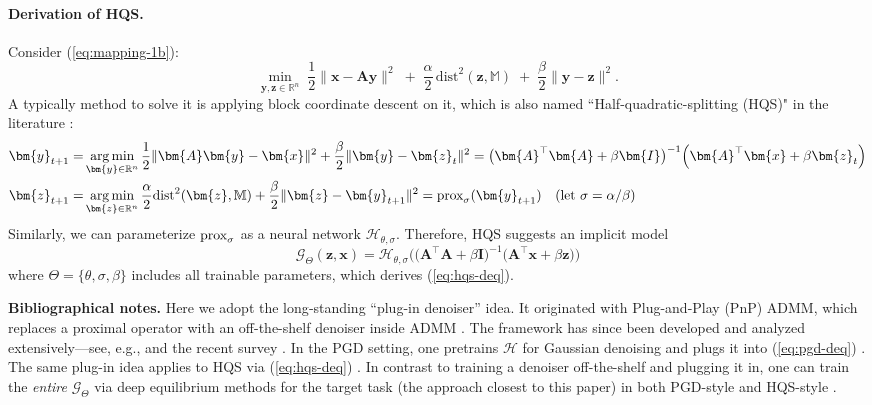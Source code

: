 \documentclass{amsart} %
\def\eqref#1{equation~\ref{#1}}
\def\vx{{\bm{x}}}
\def\vy{{\bm{y}}}
\def\vz{{\bm{z}}}
\def\mA{{\bm{A}}}
\def\mI{{\bm{I}}}
\def\sM{{\mathbb{M}}}
\def\sR{{\mathbb{R}}}
\DeclareMathOperator*{\argmin}{arg\,min}
\def\cG{{\mathcal{G}}}
\def\cH{{\mathcal{H}}}
\theoremstyle{definition}
\theoremstyle{remark}
\renewcommand{\eqref}[1]{\textup{(\ref{#1})}}
\begin{document}
\paragraph{Derivation of HQS.}
Consider \eqref{eq:mapping-1b}:
\[
\min_{\vy,\vz\in\sR^n}\;\frac{1}{2}\|\vx-\mA\vy\|^2 \;+\; \frac{\alpha}{2}\,\mathrm{dist}^2(\vz,\sM) \;+\; \frac{\beta}{2}\|\vy-\vz\|^2.
\]
A typically method to solve it is applying block coordinate descent on it, which is also named ``Half-quadratic-splitting (HQS)" in the literature \cite{geman1995nonlinear}:
\[ 
\begin{aligned}
\vy_{t+1} = & \argmin_{\vy\in\sR^n} \frac{1}{2} \|\mA \vy - \vx\|^2 + \frac{\beta}{2} \|\vy - \vz_t\|^2 = \big(\mA^\top\mA + \beta \mI \big)^{-1} \Big( \mA^\top \vx + \beta \vz_t \Big)\\
\vz_{t+1} = & \argmin_{\vz\in\sR^n} \frac{\alpha}{2} \textup{dist}^2(\vz,\sM) + \frac{\beta}{2} \|\vz - \vy_{t+1}\|^2 = \textup{prox}_{\sigma} (\vy_{t+1}) \quad (\textup{let } \sigma=\alpha/\beta)
\end{aligned}
\]
Similarly, we can parameterize $\textup{prox}_{\sigma}$ as a neural network $\cH_{\theta,\sigma}$. Therefore, HQS suggests an implicit model 
\[
\cG_{\Theta}(\vz,\vx) = \cH_{\theta,\sigma}\bigg( \big(\mA^\top\mA + \beta \mI \big)^{-1} \Big( \mA^\top \vx + \beta \vz \Big)  \bigg)
\]
where $\Theta = \{\theta,\sigma,\beta\}$ includes all trainable parameters, which derives \eqref{eq:hqs-deq}.


\textbf{Bibliographical notes.} Here we adopt the long‐standing “plug-in denoiser” idea. It originated with Plug-and-Play (PnP) ADMM, which replaces a proximal operator with an off-the-shelf denoiser inside ADMM \cite{venkatakrishnan2013plug}. The framework has since been developed and analyzed extensively—see, e.g., \cite{chan2016plug,kamilov2017plug,buzzard2018plug,sun2019online} and the recent survey \cite{kamilov2023plug}. In the PGD setting, one pretrains $\cH$ for Gaussian denoising and plugs it into \eqref{eq:pgd-deq} \cite{ryu2019plug,gavaskar2020plug,liu2021recovery,hurault2022proximal}. The same plug-in idea applies to HQS via \eqref{eq:hqs-deq} \cite{zhang2021plug,hurault2022gradient,rasti2023plug}. In contrast to training a denoiser off-the-shelf and plugging it in, one can train the \emph{entire} $\cG_\Theta$ via deep equilibrium methods for the target task (the approach closest to this paper) in both PGD-style \cite{gilton2021deep,winston2020monotone,zou2023deep,yu2024msdc,daniele2025deep,shenoy2025recovering} and HQS-style \cite{gkillas2023optimization}.
\end{document}
